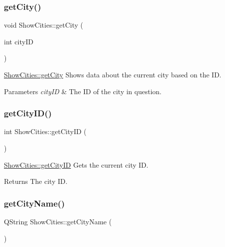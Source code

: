 \subsubsection{\texorpdfstring{get\+City()}{getCity()}}
{\footnotesize\ttfamily void Show\+Cities\+::get\+City (\begin{DoxyParamCaption}\item[{int}]{city\+ID }\end{DoxyParamCaption})}



\mbox{\hyperlink{class_show_cities_a7a03bcd5374073d6689aed90cc23ce5e}{Show\+Cities\+::get\+City}} Shows data about the current city based on the ID. 


\begin{DoxyParams}{Parameters}
{\em city\+ID} & The ID of the city in question. \\
\hline
\end{DoxyParams}
\mbox{\label{class_show_cities_ac81b38d6862643619d07f82fe12b5c02}} 
\subsubsection{\texorpdfstring{get\+City\+I\+D()}{getCityID()}}
{\footnotesize\ttfamily int Show\+Cities\+::get\+City\+ID (\begin{DoxyParamCaption}{ }\end{DoxyParamCaption})}



\mbox{\hyperlink{class_show_cities_ac81b38d6862643619d07f82fe12b5c02}{Show\+Cities\+::get\+City\+ID}} Gets the current city ID. 

\begin{DoxyReturn}{Returns}
The city ID. 
\end{DoxyReturn}
\mbox{\label{class_show_cities_a3640b91c66939d0070c3dd6f5b9eb93c}} 
\subsubsection{\texorpdfstring{get\+City\+Name()}{getCityName()}}
{\footnotesize\ttfamily Q\+String Show\+Cities\+::get\+City\+Name (\begin{DoxyParamCaption}{ }\end{DoxyParamCaption})}



